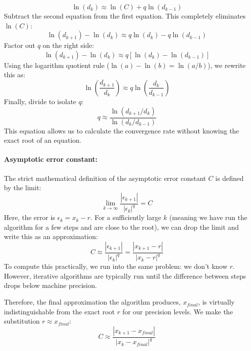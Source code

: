 \begin{equation*}
	\ln(d_k) \approx \ln(C) + q \ln(d_{k-1})
\end{equation*}
Subtract the second equation from the first equation. This completely
eliminates $\ln(C)$:
\begin{equation*}
	\ln(d_{k+1}) - \ln(d_k) \approx q \ln(d_k) - q \ln(d_{k-1})
\end{equation*}
Factor out $q$ on the right side:
\begin{equation*}
	\ln(d_{k+1}) - \ln(d_k) \approx q[ \ln(d_k) - \ln(d_{k-1}) ]
\end{equation*}
Using the logarithm quotient rule ($\ln(a) - \ln(b) = \ln(a/b)$), we rewrite
this as:
\begin{equation*}
	\ln\left(\frac{d_{k+1}}{d_k}\right) \approx q \ln\left(\frac{d_k}{d_{k-1}}\right)
\end{equation*}
Finally, divide to isolate $q$:
\begin{equation*}
	q \approx \frac{\ln(d_{k+1} / d_k)}{\ln(d_k / d_{k-1})}
\end{equation*}
This equation allows us to calculate the convergence rate without knowing the
exact root of an equation.

\paragraph{Asymptotic error constant:}
The strict mathematical definition of the asymptotic error constant $C$ is
defined by the limit:
\begin{equation*}
	\lim_{k \to \infty} \frac{|\epsilon_{k+1}|}{|\epsilon_k|^q} = C
\end{equation*}
Here, the error is $\epsilon_k = x_k - r$.
For a sufficiently large $k$ (meaning we have run the algorithm for a few steps
and are close to the root), we can drop the limit and write this as an
approximation:
\begin{equation*}
	C \approx \frac{|\epsilon_{k+1}|}{|\epsilon_k|^q} = \frac{|x_{k+1} - r|}{|x_k - r|^q}
\end{equation*}
To compute this practically, we run into the same problem: we don't know $r$.
However, iterative algorithms are typically run until the difference between
steps drops below machine precision.

Therefore, the final approximation the algorithm produces, $x_{final}$, is
virtually indistinguishable from the exact root $r$ for our precision levels.
We make the substitution $r \approx x_{final}$:
\begin{equation*}
	C \approx \frac{|x_{k+1} - x_{final}|}{|x_k - x_{final}|^q}
\end{equation*}

